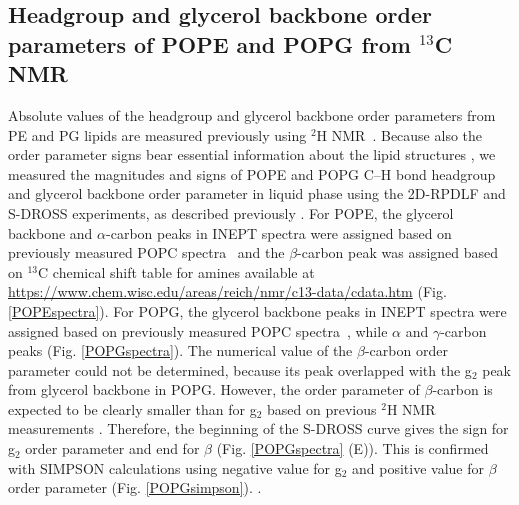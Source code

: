 \documentclass[aps,prl,superscriptaddress,twocolumn]{revtex4}
\begin{document}
\subsection{Headgroup and glycerol backbone order parameters of POPE and POPG from $^{13}$C NMR}
Absolute values of the headgroup and glycerol backbone order parameters from PE and PG lipids are measured
previously using $^2$H NMR~\cite{seelig76,gally81,wohlgemuth80,borle85}. Because also the order parameter
signs bear essential information about the lipid structures \cite{botan15,ollila16}, we measured the
magnitudes and signs of POPE and POPG C--H bond headgroup and glycerol backbone order parameter in liquid phase
using the 
2D-RPDLF and S-DROSS experiments, as described previously \cite{ferreira13,ferreira16,antila19}.
For POPE, the glycerol backbone and $\alpha$-carbon peaks in INEPT spectra were assigned based on
previously measured POPC spectra~\cite{ferreira13} and
the $\beta$-carbon peak was assigned based on $^{13}$C chemical shift table for amines available
at \url{https://www.chem.wisc.edu/areas/reich/nmr/c13-data/cdata.htm} (Fig. \ref{POPEspectra}).
For POPG, the glycerol backbone peaks in INEPT spectra were assigned based on
previously measured POPC spectra~\cite{ferreira13}, while $\alpha$ and  $\gamma$-carbon peaks
 (Fig. \ref{POPGspectra}). The numerical value of the $\beta$-carbon
order parameter could not be determined, because its peak overlapped with the g$_2$ peak from glycerol backbone in POPG.
However, the order parameter of $\beta$-carbon is expected to be clearly smaller than for g$_2$
based on previous $^2$H NMR measurements \cite{wohlgemuth80,gally81,borle85}.
Therefore, the beginning of the S-DROSS curve gives the sign for g$_2$ order parameter and end for $\beta$ (Fig. \ref{POPGspectra} (E)).
This is confirmed with SIMPSON calculations using negative value for g$_2$ and positive value for $\beta$ order parameter (Fig. \ref{POPGsimpson}).
.
\end{document}

